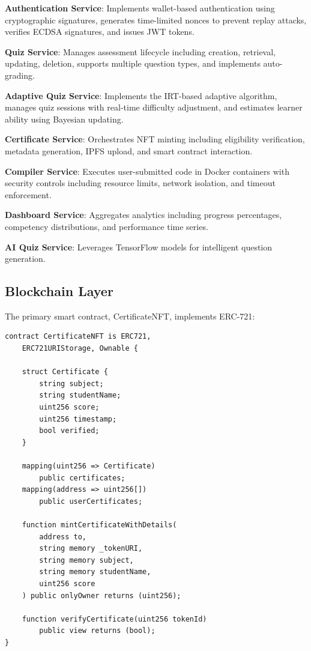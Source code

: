 \documentclass[conference]{IEEEtran}
\begin{document}
\textbf{Authentication Service}: Implements wallet-based authentication using cryptographic signatures, generates time-limited nonces to prevent replay attacks, verifies ECDSA signatures, and issues JWT tokens.

\textbf{Quiz Service}: Manages assessment lifecycle including creation, retrieval, updating, deletion, supports multiple question types, and implements auto-grading.

\textbf{Adaptive Quiz Service}: Implements the IRT-based adaptive algorithm, manages quiz sessions with real-time difficulty adjustment, and estimates learner ability using Bayesian updating.

\textbf{Certificate Service}: Orchestrates NFT minting including eligibility verification, metadata generation, IPFS upload, and smart contract interaction.

\textbf{Compiler Service}: Executes user-submitted code in Docker containers with security controls including resource limits, network isolation, and timeout enforcement.

\textbf{Dashboard Service}: Aggregates analytics including progress percentages, competency distributions, and performance time series.

\textbf{AI Quiz Service}: Leverages TensorFlow models for intelligent question generation.

\subsection{Blockchain Layer}

The primary smart contract, CertificateNFT, implements ERC-721:

\begin{lstlisting}[language=Solidity]
contract CertificateNFT is ERC721, 
    ERC721URIStorage, Ownable {
    
    struct Certificate {
        string subject;
        string studentName;
        uint256 score;
        uint256 timestamp;
        bool verified;
    }
    
    mapping(uint256 => Certificate) 
        public certificates;
    mapping(address => uint256[]) 
        public userCertificates;
    
    function mintCertificateWithDetails(
        address to,
        string memory _tokenURI,
        string memory subject,
        string memory studentName,
        uint256 score
    ) public onlyOwner returns (uint256);
    
    function verifyCertificate(uint256 tokenId) 
        public view returns (bool);
}
\end{lstlisting}
\end{document}
